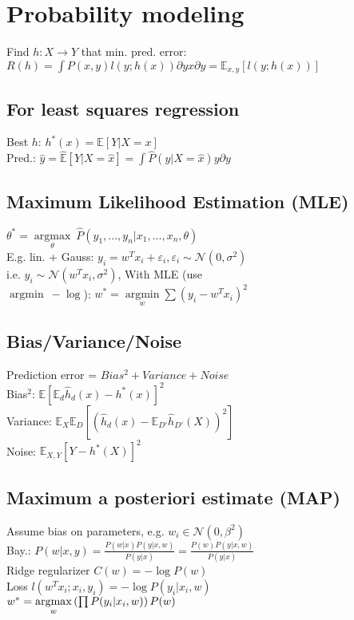 \section*{Probability modeling}
Find $h:X\rightarrow Y$ that min. pred. error: 
$R(h) = \int P(x,y)l(y;h(x)) \partial yx \partial y = \mathbb{E}_{x,y}[l(y;h(x))]$

\subsection*{For least squares regression}
Best $h$: $h^*(x) = \mathbb{E}[Y|X=x]$ \\
Pred.: $\hat{y} = \hat{\mathbb{E}}[Y|X=\hat{x}] = \int \hat{P}(y|X=\hat{x}) y \partial y$

\subsection*{Maximum Likelihood Estimation (MLE)}
$\theta^* = \underset{\theta}{\operatorname{argmax}} ~ \hat{P}(y_1,...,y_n|x_1,...,x_n,\theta)$\\
E.g. lin. + Gauss: $y_i = w^T x_i + \varepsilon_i, \varepsilon_i \sim \mathcal{N}(0, \sigma^2)$\\
i.e. $y_i \sim \mathcal{N}(w^T x_i, \sigma^2)$, With MLE (use\\ $\operatorname{argmin} ~ - \operatorname{log}$): $w^* = \underset{w}{\operatorname{argmin}} \sum (y_i-w^Tx_i)^2$

\subsection*{Bias/Variance/Noise}
Prediction error = $Bias^2 + Variance + Noise$\\
Bias$^2$: $\mathbb{E}\left[\mathbb{E}_d\hat{h}_d(x)-h^*(x)\right]^2$\\ Variance: $\mathbb{E}_X\mathbb{E}_D\left[(\hat{h}_d(x) - \mathbb{E}_{D'}\hat{h}_{D'}(X))^2\right]$\\
Noise: $\mathbb{E}_{X, Y}\left[Y-h^*(X)\right]^2$

\subsection*{Maximum a posteriori estimate (MAP)}
Assume bias on parameters, e.g. $w_i \in \mathcal{N}(0, \beta^2)$\\
Bay.: $P(w|x,y) = \frac{P(w|x) P(y|x,w)}{P(y|x)} = \frac{P(w) P(y|x,w)}{P(y|x)}$\\
Ridge regularizer $C(w)=-\log P(w)$\\
Loss $l(w^Tx_i;x_i,y_i)=-\log P(y_i|x_i,w)$\\
$w^* = \underset{w}{\operatorname*{argmax}} \left(\prod P(y_i|x_i,w)\right)P(w)$

